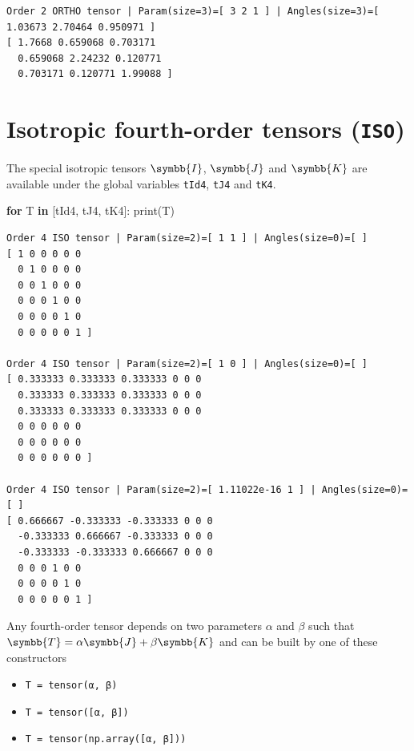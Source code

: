 \documentclass[
  a4paper,
  numbers=noendperiod,
  DIV=12]{scrreprt}
\newenvironment{Shaded}{\begin{snugshade}}{\end{snugshade}}
\newcommand{\BuiltInTok}[1]{#1}
\newcommand{\ControlFlowTok}[1]{\textcolor[rgb]{0.13,0.29,0.53}{\textbf{#1}}}
\newcommand{\KeywordTok}[1]{\textcolor[rgb]{0.13,0.29,0.53}{\textbf{#1}}}
\newcommand{\NormalTok}[1]{#1}
\providecommand{\tightlist}{%
  \setlength{\itemsep}{0pt}\setlength{\parskip}{0pt}}
\newcommand{\uuuu}[1]{{\symbb{{#1}}}}
\begin{document}
\begin{verbatim}
Order 2 ORTHO tensor | Param(size=3)=[ 3 2 1 ] | Angles(size=3)=[ 1.03673 2.70464 0.950971 ]
[ 1.7668 0.659068 0.703171 
  0.659068 2.24232 0.120771 
  0.703171 0.120771 1.99088 ]
\end{verbatim}

\section{\texorpdfstring{Isotropic fourth-order tensors
(\texttt{ISO})}{Isotropic fourth-order tensors (ISO)}}\label{isotropic-fourth-order-tensors-iso}

The special isotropic tensors \(\uuuu{I}\), \(\uuuu{J}\) and
\(\uuuu{K}\) are available under the global variables \texttt{tId4},
\texttt{tJ4} and \texttt{tK4}.

\begin{Shaded}
\begin{Highlighting}[]
\ControlFlowTok{for}\NormalTok{ T }\KeywordTok{in}\NormalTok{ [tId4, tJ4, tK4]:}
    \BuiltInTok{print}\NormalTok{(T)}
\end{Highlighting}
\end{Shaded}

\begin{verbatim}
Order 4 ISO tensor | Param(size=2)=[ 1 1 ] | Angles(size=0)=[ ]
[ 1 0 0 0 0 0 
  0 1 0 0 0 0 
  0 0 1 0 0 0 
  0 0 0 1 0 0 
  0 0 0 0 1 0 
  0 0 0 0 0 1 ]

Order 4 ISO tensor | Param(size=2)=[ 1 0 ] | Angles(size=0)=[ ]
[ 0.333333 0.333333 0.333333 0 0 0 
  0.333333 0.333333 0.333333 0 0 0 
  0.333333 0.333333 0.333333 0 0 0 
  0 0 0 0 0 0 
  0 0 0 0 0 0 
  0 0 0 0 0 0 ]

Order 4 ISO tensor | Param(size=2)=[ 1.11022e-16 1 ] | Angles(size=0)=[ ]
[ 0.666667 -0.333333 -0.333333 0 0 0 
  -0.333333 0.666667 -0.333333 0 0 0 
  -0.333333 -0.333333 0.666667 0 0 0 
  0 0 0 1 0 0 
  0 0 0 0 1 0 
  0 0 0 0 0 1 ]
\end{verbatim}

Any fourth-order tensor depends on two parameters \(\alpha\) and
\(\beta\) such that \(\uuuu{T}=\alpha \uuuu{J} + \beta \uuuu{K}\) and
can be built by one of these constructors

\begin{itemize}
\tightlist
\item
  \texttt{T\ =\ tensor(α,\ β)}
\item
  \texttt{T\ =\ tensor({[}α,\ β{]})}
\item
  \texttt{T\ =\ tensor(np.array({[}α,\ β{]}))}
\end{itemize}
\end{document}
